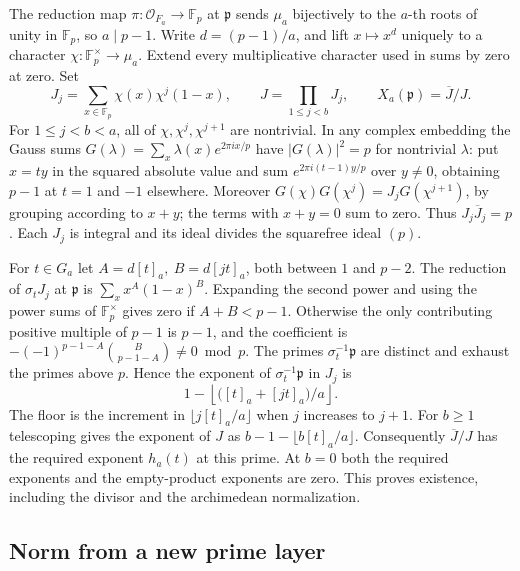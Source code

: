 The reduction map \(\pi:\mathcal O_{F_a}\to\mathbb F_p\) at
\(\mathfrak p\) sends \(\mu_a\) bijectively to the \(a\)-th roots
of unity in \(\mathbb F_p\), so \(a\mid p-1\). Write
\(d=(p-1)/a\), and lift \(x\mapsto x^d\) uniquely to a character
\(\chi:\mathbb F_p^\times\to\mu_a\). Extend every multiplicative
character used in sums by zero at zero. Set
\[
 J_j=\sum_{x\in\mathbb F_p}\chi(x)\chi^j(1-x),\qquad
 J=\prod_{1\le j<b}J_j,\qquad X_a(\mathfrak p)=\overline J/J .
\]
For \(1\le j<b<a\), all of \(\chi,\chi^j,\chi^{j+1}\) are
nontrivial. In any complex embedding the Gauss sums
\(G(\lambda)=\sum_x\lambda(x)e^{2\pi i x/p}\) have
\(\lvert G(\lambda)\rvert^2=p\) for nontrivial \(\lambda\):
put \(x=ty\) in the squared absolute value and sum
\(e^{2\pi i(t-1)y/p}\) over \(y\ne0\), obtaining \(p-1\) at
\(t=1\) and \(-1\) elsewhere. Moreover
\(G(\chi)G(\chi^j)=J_jG(\chi^{j+1})\), by grouping according
to \(x+y\); the terms with \(x+y=0\) sum to zero.
Thus \(J_j\overline J_j=p\). Each \(J_j\) is integral and its
ideal divides the squarefree ideal \((p)\).

For \(t\in G_a\) let \(A=d[t]_a,\ B=d[jt]_a\), both between
\(1\) and \(p-2\). The reduction of \(\sigma_t J_j\) at
\(\mathfrak p\) is \(\sum_x x^A(1-x)^B\).
Expanding the second power and using the power sums of
\(\mathbb F_p^\times\) gives zero if \(A+B<p-1\). Otherwise the
only contributing positive multiple of \(p-1\) is \(p-1\), and
the coefficient is
\(-(-1)^{p-1-A}\binom{B}{p-1-A}\ne0\bmod p\).
The primes \(\sigma_t^{-1}\mathfrak p\) are distinct and exhaust
the primes above \(p\). Hence the exponent of
\(\sigma_t^{-1}\mathfrak p\) in \(J_j\) is
\[
       1-\left\lfloor\big([t]_a+[jt]_a\big)/a\right\rfloor .
\]
The floor is the increment in \(\lfloor j[t]_a/a\rfloor\)
when \(j\) increases to \(j+1\). For \(b\ge1\) telescoping
gives the exponent of \(J\) as \(b-1-\lfloor b[t]_a/a\rfloor\).
Consequently \(\overline J/J\) has the required exponent
\(h_a(t)\) at this prime. At \(b=0\) both the required
exponents and the empty-product exponents are zero. This proves
existence, including the divisor and the archimedean normalization.

\subsection{Norm from a new prime layer}

